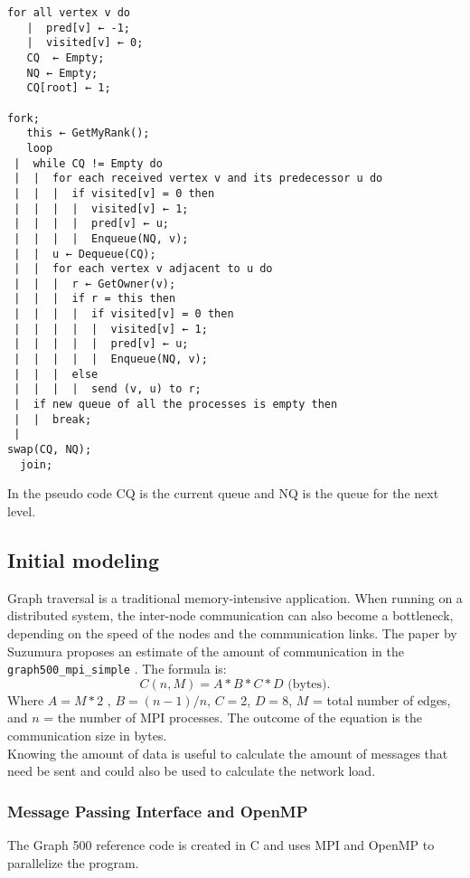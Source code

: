 \begin{lstlisting}[label={code:pseudo-simple},caption={Pseudo code taken from paper \cite{suzumura2011performance}}]
for all vertex v do 
   |  pred[v] ← -1; 
   |  visited[v] ← 0; 
   CQ  ← Empty; 
   NQ ← Empty; 
   CQ[root] ← 1; 
   
fork;
   this ← GetMyRank(); 
   loop 
 |  while CQ != Empty do 
 |  |  for each received vertex v and its predecessor u do 
 |  |  |  if visited[v] = 0 then 
 |  |  |  |  visited[v] ← 1; 
 |  |  |  |  pred[v] ← u; 
 |  |  |  |  Enqueue(NQ, v); 
 |  |  u ← Dequeue(CQ); 
 |  |  for each vertex v adjacent to u do 
 |  |  |  r ← GetOwner(v); 
 |  |  |  if r = this then 
 |  |  |  |  if visited[v] = 0 then 
 |  |  |  |  |  visited[v] ← 1; 
 |  |  |  |  |  pred[v] ← u; 
 |  |  |  |  |  Enqueue(NQ, v); 
 |  |  |  else 
 |  |  |  |  send (v, u) to r; 
 |  if new queue of all the processes is empty then 
 |  |  break; 
 |  
swap(CQ, NQ); 
  join;
\end{lstlisting}
In the pseudo code CQ is the current queue and NQ is the queue for the next level.
 

\subsection*{Initial modeling}
Graph traversal is a traditional memory-intensive application. When running on a distributed system, the inter-node communication can also become a bottleneck, depending on the speed of the nodes and the communication links. 
The paper by Suzumura \cite{suzumura2011performance} proposes an estimate of the amount of communication in the \texttt{graph500\_mpi\_simple} . The formula is:
\begin{equation}
\label{eq:communication_size}
C(n, M) = A * B * C * D \text{ (bytes)}.
\end{equation}
Where $A = M*2$ , $B = (n-1)/n$, $C=2$, $D=8$, $M$ = total number of edges, and $n$ = the number of MPI processes. The outcome of the equation is the communication size in bytes. \\
Knowing the amount of data is useful to calculate the amount of messages that need be sent and could also be used to calculate the network load.

\subsubsection{Message Passing Interface and OpenMP}
\label{mpiopenmp}
The Graph 500 reference code is created in C and uses MPI and OpenMP to parallelize the program.

